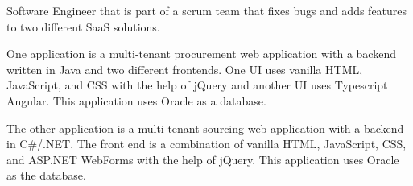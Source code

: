 

\begin{cvparagraph}
    Software Engineer that is part of a scrum team that fixes bugs and adds features to two different SaaS solutions.  

    One application is a multi-tenant procurement web application with a backend written in Java and two different frontends. One UI uses vanilla HTML, JavaScript, and CSS with the help of jQuery and another UI uses Typescript Angular. This application uses Oracle as a database.  

    The other application is a multi-tenant sourcing web application with a backend in C\#/.NET. The front end is a combination of vanilla HTML, JavaScript, CSS, and ASP.NET WebForms with the help of jQuery. This application uses Oracle as the database.
\end{cvparagraph}
